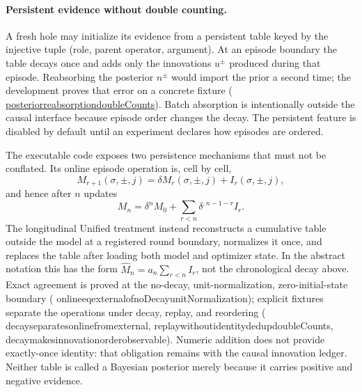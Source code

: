 \documentclass[11pt]{article}
\newcommand{\leanname}[1]{{\scriptsize\ttfamily
  \def\_{\textunderscore\allowbreak}#1}}
\newcommand{\formalcommit}{f3a31db36bb2f944312ee31c1d86c2758109e83a}
\newcommand{\leansource}[3]{%
  \href{https://github.com/zariuq/MeTTapedia/blob/\formalcommit/#1\#L#2}{\leanname{#3}}}
\begin{document}
\paragraph{Persistent evidence without double counting.}
A fresh hole may initialize its evidence from a persistent table keyed by the injective
tuple (role, parent operator, argument). At an episode boundary the table decays once and
adds only the innovations $u^\pm$ produced during that episode. Reabsorbing the posterior
$n^\pm$ would import the prior a second time; the development proves that error on a
concrete fixture
(\leansource{lean/mettapedia/Mettapedia/MachineLearning/NeuralNetworks/UnifiedCarrier/Core.lean}{226-L231}{posterior\_reabsorption\_doubleCounts}).
Batch absorption is intentionally outside the causal interface because episode order
changes the decay. The persistent feature is disabled by default until an experiment
declares how episodes are ordered.

The executable code exposes two persistence mechanisms that must not be conflated.  Its
online episode operation is, cell by cell,
\[
 M_{r+1}(\sigma,\pm,j)=\delta M_r(\sigma,\pm,j)+I_r(\sigma,\pm,j),
\]
and hence after $n$ updates
\[
 M_n=\delta^nM_0+\sum_{r<n}\delta^{,n-1-r}I_r .
\]
The longitudinal Unified treatment instead reconstructs a cumulative table outside the
model at a registered round boundary, normalizes it once, and replaces the table after
loading both model and optimizer state.  In the abstract notation this has the form
$\widehat M_n=a_n\sum_{r<n}I_r$, not the chronological decay above.  Exact agreement is
proved at the no-decay, unit-normalization, zero-initial-state boundary
(\leanname{online\_eq\_external\_of\_noDecay\_unitNormalization}); explicit fixtures
separate the operations under decay, replay, and reordering
(\leanname{decay\_separates\_online\_from\_external},
\leanname{replay\_without\_identity\_dedup\_doubleCounts},
\leanname{decay\_makes\_innovation\_order\_observable}).  Numeric addition does not
provide exactly-once identity: that obligation remains with the causal innovation
ledger.  Neither table is called a Bayesian posterior merely because it carries
positive and negative evidence.
\end{document}

